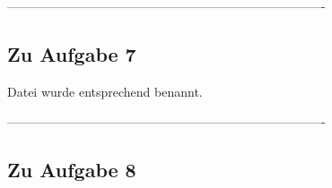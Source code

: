 \documentclass[12pt]{article}
\begin{document}
%
 ----------------------------------------------------------------------------
\subsection{Zu Aufgabe 7}
Datei wurde entsprechend benannt.

%
 ----------------------------------------------------------------------------
\subsection{Zu Aufgabe 8}
\end{document}
